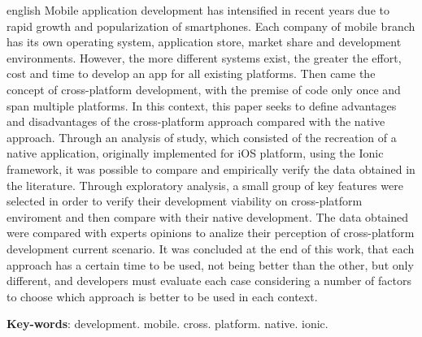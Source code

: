 \begin{resumo}[Abstract]
\begin{otherlanguage*}{english}
  Mobile application development has intensified in recent years due to rapid growth and popularization of smartphones. Each company of 
  mobile branch has its own operating system, application store, market share and development environments. 
  However, the more different systems exist, the greater the effort, cost and time to develop an app for all existing platforms. Then came the concept of cross-platform development, 
  with the premise of code only once and span multiple platforms. In this context, this paper seeks to define advantages and disadvantages of the cross-platform approach 
  compared with the native approach. Through an analysis of study, which consisted of the recreation of a native application, originally implemented for iOS platform, 
  using the Ionic framework, it was possible to compare and empirically verify the data obtained in the literature. Through exploratory analysis, a small group of key features were selected
  in order to verify their development viability on cross-platform enviroment and then compare with their native development. The data obtained were compared with experts opinions to 
  analize their perception of cross-platform development current scenario. It was concluded at the end of this work, that each approach has a certain time 
  to be used, not being better than the other, but only different, and developers must evaluate each case considering a number of factors to choose which approach is better to be used in each context.

  \vspace{\onelineskip}

  \noindent 
  \textbf{Key-words}: development. mobile. cross. platform. native. ionic.
 \end{otherlanguage*}
\end{resumo}

